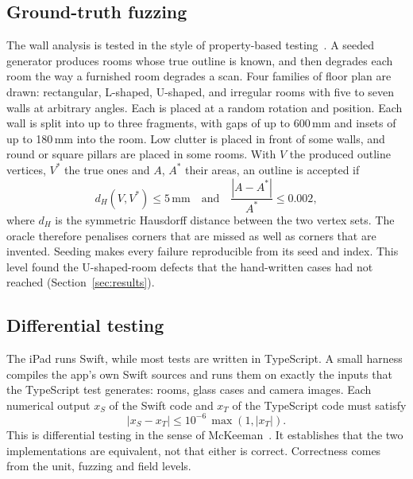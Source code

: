 \documentclass[conference,a4paper,10pt]{IEEEtran}
\begin{document}
\subsection{Ground-truth fuzzing}

The wall analysis is tested in the style of property-based
testing~\cite{quickcheck}. A seeded generator produces rooms whose true
outline is known, and then degrades each room the way a furnished room
degrades a scan. Four families of floor plan are drawn: rectangular, L-shaped,
U-shaped, and irregular rooms with five to seven walls at arbitrary angles.
Each is placed at a random rotation and position. Each wall is split into up
to three fragments, with gaps of up to 600\,mm and insets of up to 180\,mm
into the room. Low clutter is placed in front of some walls, and round or
square pillars are placed in some rooms. With $V$ the produced outline
vertices, $V^{\ast}$ the true ones and $A$, $A^{\ast}$ their areas, an
outline is accepted if
\begin{equation}
d_H(V,V^{\ast}) \le 5\,\text{mm} \quad\text{and}\quad
\frac{|A-A^{\ast}|}{A^{\ast}} \le 0.002,
\label{eq:oracle}
\end{equation}
where $d_H$ is the symmetric Hausdorff distance between the two vertex sets.
The oracle therefore penalises corners that are missed as well as corners
that are invented. Seeding makes every failure reproducible from its seed
and index. This level found the U-shaped-room defects that the hand-written
cases had not reached (Section~\ref{sec:results}).

\subsection{Differential testing}\label{sec:differential}

The iPad runs Swift, while most tests are written in TypeScript. A small
harness compiles the app's own Swift sources and runs them on exactly the
inputs that the TypeScript test generates: rooms, glass cases and camera
images. Each numerical output $x_S$ of the Swift code and $x_T$ of the
TypeScript code must satisfy
\begin{equation}
|x_S - x_T| \le 10^{-6}\,\max(1, |x_T|).
\label{eq:parity}
\end{equation}
This is differential testing in the sense of McKeeman~\cite{mckeeman}. It
establishes that the two implementations are equivalent, not that either is
correct. Correctness comes from the unit, fuzzing and field levels.
\end{document}
